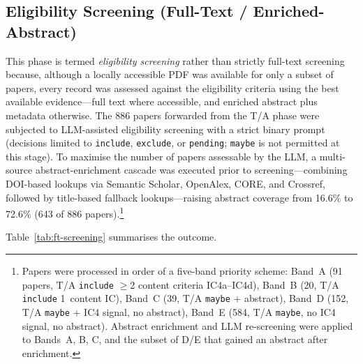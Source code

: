 \subsection{Eligibility Screening (Full-Text / Enriched-Abstract)}
\label{sec:slr-ft-screening}

This phase is termed \emph{eligibility screening} rather than strictly
full-text screening because, although a locally accessible PDF was available
for only a subset of papers, every record was assessed against the
eligibility criteria using the best available evidence---full text where
accessible, and enriched abstract plus metadata otherwise.
The 886 papers forwarded from the T/A phase were subjected to LLM-assisted
eligibility screening with a strict binary prompt (decisions limited to
\texttt{include}, \texttt{exclude}, or \texttt{pending}; \texttt{maybe}
is not permitted at this stage). To maximise the number of papers assessable by the LLM, a
multi-source abstract-enrichment cascade was executed prior to
screening---combining DOI-based lookups via Semantic Scholar, OpenAlex, CORE,
and Crossref, followed by title-based fallback lookups---raising abstract
coverage from 16.6\% to 72.6\% (643 of 886 papers).\footnote{Papers were
  processed in order of a five-band priority scheme: Band~A (91 papers,
  T/A \texttt{include} $\geq$2 content criteria IC4a--IC4d), Band~B (20, T/A \texttt{include} 1~content IC),
  Band~C (39, T/A \texttt{maybe} + abstract), Band~D (152, T/A \texttt{maybe}
  + IC4 signal, no abstract), Band~E (584, T/A \texttt{maybe}, no IC4 signal, no
  abstract). Abstract enrichment and LLM re-screening were applied to Bands~A,
  B, C, and the subset of D/E that gained an abstract after enrichment.}

Table~\ref{tab:ft-screening} summarises the outcome.

